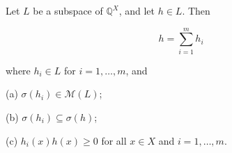 Let $L$ be a subspace of $\mathbb{Q}^X$, and let $h \in L$. Then

$$h = \sum_{i=1}^{m} h_i$$

where $h_i \in L$ for $i = 1, \ldots, m$, and

(a) $\sigma(h_i) \in \mathcal{M}(L)$;

(b) $\sigma(h_i) \subseteq \sigma(h)$;

(c) $h_i(x)h(x) \geq 0$ for all $x \in X$ and $i = 1, \ldots, m$.
